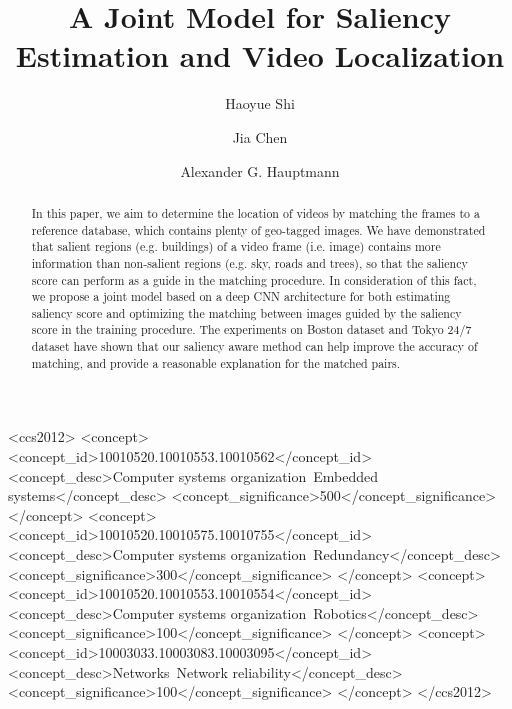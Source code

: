 \documentclass[sigconf, review=true, anonymous=true]{acmart}
\begin{document}
\title{A Joint Model for Saliency Estimation and Video Localization}

\author{Haoyue Shi}

\author{Jia Chen}

\author{Alexander G. Hauptmann}


\begin{abstract}
\par
In this paper, we aim to determine the location of videos by matching the frames to a reference database, which contains plenty of geo-tagged images. We have demonstrated that salient regions (e.g. buildings) of a video frame (i.e. image) contains more information than non-salient regions (e.g. sky, roads and trees), so that the saliency score can perform as a guide in the matching procedure. In consideration of this fact, we propose a joint model based on a deep CNN architecture for both estimating saliency score and optimizing the matching between images guided by the saliency score in the training procedure. The experiments on Boston dataset and Tokyo 24/7 dataset have shown that our saliency aware method can help improve the accuracy of matching, and provide a reasonable explanation for the matched pairs. 
\end{abstract}

\begin{CCSXML}
<ccs2012>
 <concept>
  <concept_id>10010520.10010553.10010562</concept_id>
  <concept_desc>Computer systems organization~Embedded systems</concept_desc>
  <concept_significance>500</concept_significance>
 </concept>
 <concept>
  <concept_id>10010520.10010575.10010755</concept_id>
  <concept_desc>Computer systems organization~Redundancy</concept_desc>
  <concept_significance>300</concept_significance>
 </concept>
 <concept>
  <concept_id>10010520.10010553.10010554</concept_id>
  <concept_desc>Computer systems organization~Robotics</concept_desc>
  <concept_significance>100</concept_significance>
 </concept>
 <concept>
  <concept_id>10003033.10003083.10003095</concept_id>
  <concept_desc>Networks~Network reliability</concept_desc>
  <concept_significance>100</concept_significance>
 </concept>
</ccs2012>  
\end{CCSXML}
\end{document}
